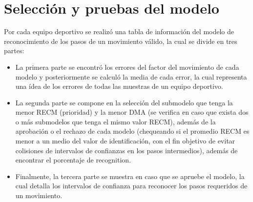 \section{Selecci\'on y pruebas del modelo} \label{res:chooseModel}
Por cada equipo deportivo se realiz\'o una tabla de informaci\'on del modelo de reconocimiento de los pasos de un movimiento v\'alido, la cual se divide en tres partes:
\begin{itemize}
\item  La primera parte se encontr\'o los errores del factor del movimiento de cada modelo y posteriormente se calcul\'o la media de cada error, la cual representa una \'idea de los  errores de todas las muestras de un equipo deportivo.
\item  La segunda parte se compone en la selecci\'on del submodelo que tenga la menor RECM (prioridad) y la menor DMA (se verifica en caso que exista dos o m\'as submodelos que tenga el mismo valor RECM), adem\'as de la aprobaci\'on o el rechazo de cada modelo (chequeando si el promedio RECM es menor a un medio del valor de identificaci\'on, con el fin objetivo de evitar colisiones de intervalos de confianzas en los pasos intermedios),  adem\'as de encontrar el porcentaje de recognition.
\item Finalmente, la tercera parte se muestra en caso que se apruebe el modelo, la cual detalla los intervalos de confianza para reconocer los pasos requeridos  de un movimiento.
\end{itemize}
